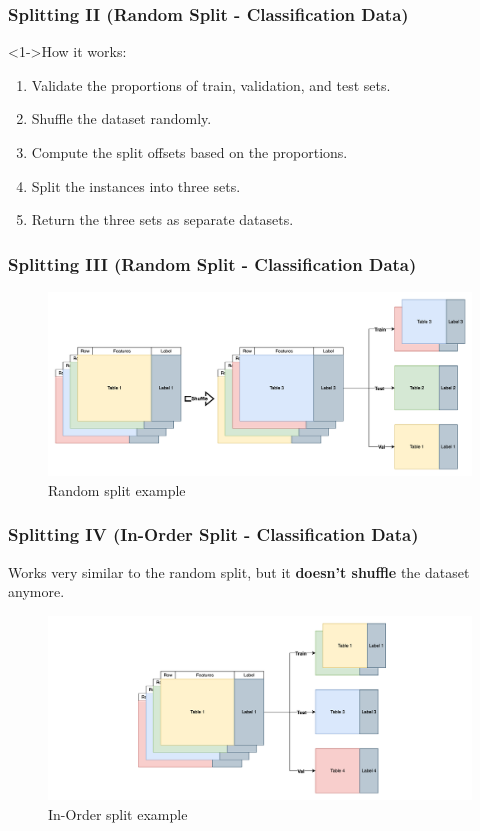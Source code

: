 \documentclass[t,english]{beamer}
\begin{document}
\begin{frame}
  \frametitle{Splitting II (Random Split - Classification Data)}
  \begin{block}<1->{How it works:}
    \begin{enumerate}
      \item<1-> Validate the proportions of train, validation, and test sets.
      \item <2-> Shuffle the dataset randomly.
      \item <3-> Compute the split offsets based on the proportions.
      \item <4-> Split the instances into three sets.
      \item <5-> Return the three sets as separate datasets.
    \end{enumerate}
  \end{block}
\end{frame}

\begin{frame}
  \frametitle{Splitting III (Random Split - Classification Data)}
  \begin{figure}[H]
    \includegraphics[width=1\textwidth]{figures/splitting/random_split.png}
    \caption{Random split example}
    \label{fig:random_split}
  \end{figure}
\end{frame}

\begin{frame}
  \frametitle{Splitting IV (In-Order Split - Classification Data)}
  Works very similar to the random split, but it \textbf{doesn't shuffle} the dataset anymore.

  \begin{figure}[H]
    \includegraphics[width=1\textwidth]{figures/splitting/in_order_split.png}
    \caption{In-Order split example}
    \label{fig:in_order_split}
  \end{figure}
\end{frame}
\end{document}
